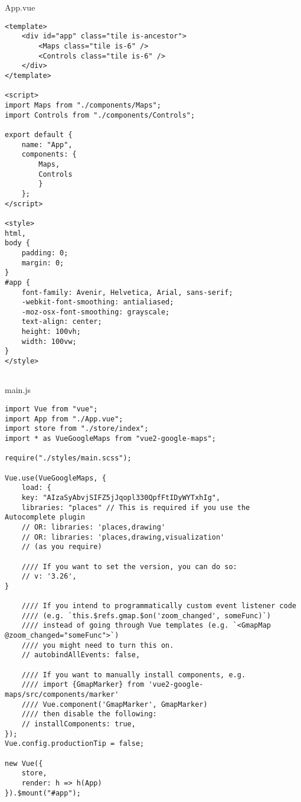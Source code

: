 \chapter{}
\label{ch:broncode_frontend}
App.vue
\begin{lstlisting}
<template>
	<div id="app" class="tile is-ancestor">
		<Maps class="tile is-6" />
		<Controls class="tile is-6" />
	</div>
</template>

<script>
import Maps from "./components/Maps";
import Controls from "./components/Controls";

export default {
	name: "App",
	components: {
		Maps,
		Controls
		}
	};
</script>

<style>
html,
body {
	padding: 0;
	margin: 0;
}
#app {
	font-family: Avenir, Helvetica, Arial, sans-serif;
	-webkit-font-smoothing: antialiased;
	-moz-osx-font-smoothing: grayscale;
	text-align: center;
	height: 100vh;
	width: 100vw;
}
</style>


\end{lstlisting}
main.js
\begin{lstlisting}
import Vue from "vue";
import App from "./App.vue";
import store from "./store/index";
import * as VueGoogleMaps from "vue2-google-maps";

require("./styles/main.scss");

Vue.use(VueGoogleMaps, {
	load: {
	key: "AIzaSyAbvjSIFZ5jJqopl330QpfFtIDyWYTxhIg",
	libraries: "places" // This is required if you use the Autocomplete plugin
	// OR: libraries: 'places,drawing'
	// OR: libraries: 'places,drawing,visualization'
	// (as you require)
	
	//// If you want to set the version, you can do so:
	// v: '3.26',
}
	
	//// If you intend to programmatically custom event listener code
	//// (e.g. `this.$refs.gmap.$on('zoom_changed', someFunc)`)
	//// instead of going through Vue templates (e.g. `<GmapMap @zoom_changed="someFunc">`)
	//// you might need to turn this on.
	// autobindAllEvents: false,
	
	//// If you want to manually install components, e.g.
	//// import {GmapMarker} from 'vue2-google-maps/src/components/marker'
	//// Vue.component('GmapMarker', GmapMarker)
	//// then disable the following:
	// installComponents: true,
});
Vue.config.productionTip = false;

new Vue({
	store,
	render: h => h(App)
}).$mount("#app");
\end{lstlisting}
